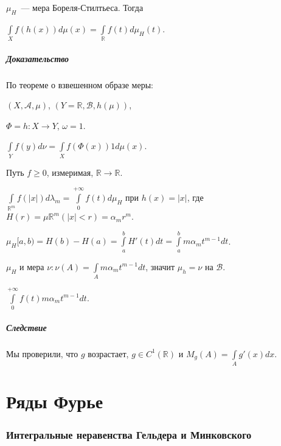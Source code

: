 \documentclass{article}
\begin{document}
            $\mu_H$~--- мера Бореля-Стилтьеса. Тогда
        
            $\int\limits_X f \left( h(x) \right) d \mu(x) = \int\limits_{\mathbb{R}} f(t) d \mu_H (t)$.
        
        \subsubsection{Доказательство}
        
            По теореме о взвешенном образе меры:
            
            $(X, \mathcal{A}, \mu)$, $(Y = \mathbb{R}, \mathcal{B}, h(\mu))$,
            
            $\Phi = h : X \rightarrow Y$, $\omega = 1$.
            
            $\int\limits_Y f(y) d \nu = \int\limits_X f(\Phi(x)) 1 d \mu(x)$.
            
        Путь $f \geqslant 0$, измеримая, $\mathbb{R} \rightarrow \mathbb{R}$.
    
        $\int\limits_{\mathbb{R}^m} f \left( | x | \right) d \lambda_m = \int\limits_0^{+\infty} f(t) d \mu_H$ при $h(x) = |x|$, где $H(r) = \mu \mathbb{R}^m \left( |x| < r \right) = \alpha_m r^m$.
    
        $\mu_H [a, b) = H(b) - H(a) = \int\limits^b_a H'(t) dt = \int\limits^b_a m \alpha_m t^{m - 1} dt$.
    
        $\mu_H$ и мера $\nu : \nu(A) = \int\limits_A m \alpha_m t^{m - 1} dt$, значит $\mu_h = \nu$ на $\mathcal{B}$. 
    
        $\int\limits^{+\infty}_0 f(t) m \alpha_m t^{m - 1} dt$.
    
            \subsubsection{Следствие}
        
                Мы проверили, что $g$ возрастает, $g \in C^1 \left( \mathbb{R} \right)$ и $M_g(A) = \int\limits_A g'(x) dx$.
            
\newpage

\part{Ряды Фурье}

\newpage

    \section{Интегральные неравенства Гельдера и Минковского}
    
\end{document}
